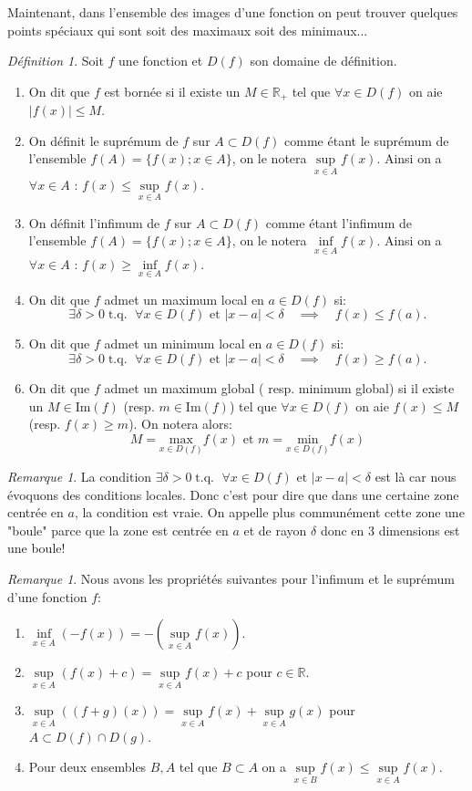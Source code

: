 \documentclass[oneside,12pt,french,table]{book}
\theoremstyle{definition}
\theoremstyle{plain}
\theoremstyle{remark}
\newtheorem{remark}[definition]{Remarque}
\newtheorem{defi}[definition]{Définition}
\newcommand{\Rr}{{\mathbb{R}}}
\begin{document}
Maintenant, dans l'ensemble des images d'une fonction on peut trouver quelques points spéciaux qui sont soit des maximaux soit des minimaux...
\begin{defi}
Soit $f$ une fonction et $D(f)$ son domaine de définition. 
\begin{enumerate}
    \item On dit que $f$ est bornée si il existe un $M\in \Rr_+$ tel que $\forall x \in D(f)$ on aie $|f(x)|\leq M $.
    \item On définit le suprémum de $f$ sur $A\subset D(f)$ comme étant le suprémum de l'ensemble $f(A)=\{f(x) ; x\in A\}$, on le notera $\underset{x\in A}{\sup}f(x)$. Ainsi on a $\forall x \in A $ : $f(x) \leq \underset{x\in A}{\sup}f(x)$.
    \item On définit l'infimum de $f$ sur $A\subset D(f)$ comme étant l'infimum de l'ensemble $f(A)=\{f(x) ; x\in A\}$, on le notera $\underset{x\in A}{\inf}f(x)$. Ainsi on a $\forall x \in A $ : $f(x) \geq \underset{x\in A}{\inf}f(x)$.
    \item On dit que  $f$ admet un maximum local en $a\in D(f)$ si: \[\exists \delta >0 \; \text{t.q. } \;\forall x\in D(f) \text{ et } |x-a|<\delta \quad\implies\quad f(x)\leq f(a).\] 
    \item On dit que  $f$ admet un minimum local en $a\in D(f)$ si: \[\exists \delta >0\; \text{t.q. } \;\forall x\in D(f) \text{ et } |x-a|<\delta \quad\implies\quad f(x)\geq f(a).\]
    \item On dit que $f$ admet un maximum global ( resp. minimum global) si il existe un $M\in$Im$(f)$ (resp. $m\in$Im$(f)$) tel que $\forall x \in D(f)$ on aie $f(x)\leq M$ (resp. $f(x)\geq m$). On notera alors: 
    $$M=\underset{x\in D(f)}{\text{max}}f(x) \text{ et } m=\underset{x\in D(f)}{\text{min}}f(x)$$
\end{enumerate}
\end{defi}
\begin{remark}
    La condition $ \exists \delta >0\; \text{t.q. } \;\forall x\in D(f) \text{ et } |x-a|<\delta$ est là car nous évoquons des conditions locales. Donc c'est pour dire que dans une certaine zone centrée en $a$, la condition est vraie. On appelle plus communément cette zone une "boule" parce que la zone est centrée en $a$ et de rayon $\delta$ donc en 3 dimensions est une boule!
\end{remark}
   \begin{remark}
       Nous avons les propriétés suivantes pour l'infimum et le suprémum d'une fonction $f$: 
       \begin{enumerate}
           \item $\underset{x\in A}{\inf}(-f(x))=-(\underset{x\in A}{\sup}f(x))$.
           \item $\underset{x\in A}{\sup}(f(x)+c)=\underset{x\in A}{\sup}f(x)+c$ pour $c\in \Rr$.
           \item $\underset{x\in A}{\sup}((f+g)(x))=\underset{x\in A}{\sup}f(x)+\underset{x\in A}{\sup}g(x)$ pour $A\subset D(f)\cap D(g)$.
           \item Pour deux ensembles $B,A$ tel que $B\subset A $ on a $\underset{x\in B}{\sup}f(x)\leq \underset{x\in A}{\sup}f(x)$.
       \end{enumerate}
   \end{remark}
\end{document}
